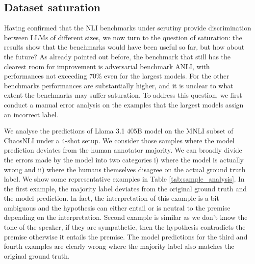 \begin{table}
\centering
{}
\caption{Monotonicity values for the 8B and 70B models during the course of the training. We report both the discrete ($mon_{disc}$) and continuous ($mon_{cont}$) monotonicity values.}
\label{tab:monotonicity}
\end{table}

\subsection{Dataset saturation}\label{subsec:saturation}
Having confirmed that the NLI benchmarks under scrutiny provide discrimination between LLMs of different sizes, we now turn to the question of saturation: the results show that the benchmarks would have been useful so far, but how about the future?
As already pointed out before, the benchmark that still has the clearest room for improvement is adversarial benchmark ANLI, with performances not exceeding 70\% even for the largest models.
For the other benchmarks performances are substantially higher, and it is unclear to what extent the benchmarks may suffer saturation.
To address this question, we first conduct a manual error analysis on the examples that the largest models assign an incorrect label.

We analyse the predictions of Llama 3.1 405B model on the MNLI subset of ChaosNLI under a 4-shot setup. We consider those samples where the model prediction deviates from the human annotator majority. We can broadly divide the errors made by the model into two categories i) where the model is actually wrong and ii) where the humans themselves disagree on the actual ground truth label. We show some representative examples in Table \ref{tab:sample_analysis}. In the first example, the majority label deviates from the original ground truth and the model prediction. In fact, the interpretation of this example is a bit ambiguous and the hypothesis can either entail or is neutral to the premise depending on the interpretation. Second example is similar as we don't know the tone of the speaker, if they are sympathetic, then the hypothesis contradicts the premise otherwise it entails the premise. The model predictions for the third and fourth examples are clearly wrong where the majority label also matches the original ground truth.



